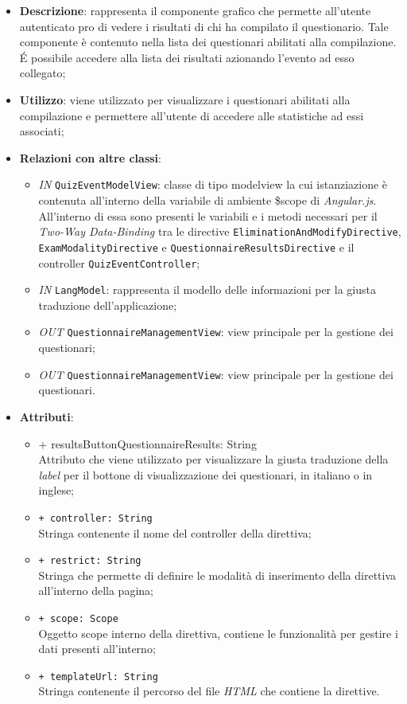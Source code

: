 \begin{itemize}
	\item \textbf{Descrizione}: rappresenta il componente grafico che permette all'utente autenticato pro di vedere i risultati di chi ha compilato il questionario. Tale componente è contenuto nella lista dei questionari abilitati alla compilazione. \'E possibile accedere alla lista dei risultati azionando l'evento ad esso collegato;
	\item \textbf{Utilizzo}: viene utilizzato per visualizzare i questionari abilitati alla compilazione e permettere all'utente di accedere alle statistiche ad essi associati;
	\item \textbf{Relazioni con altre classi}: 
	\begin{itemize} 
		\item \textit{IN} \texttt{QuizEventModelView}: classe di tipo modelview la cui istanziazione è contenuta all'interno della variabile di ambiente \$scope di \textit{Angular.js}. All'interno di essa sono presenti le variabili e i metodi necessari per il \textit{Two-Way Data-Binding} tra le directive \texttt{EliminationAndModifyDirective}, \texttt{ExamModalityDirective} e \texttt{QuestionnaireResultsDirective} e il controller \texttt{QuizEventController};
		\item \textit{IN} \texttt{LangModel}: rappresenta il modello delle informazioni per la giusta traduzione dell'applicazione;
		\item \textit{OUT} \texttt{QuestionnaireManagementView}: view principale per la gestione dei questionari;
		\item \textit{OUT} \texttt{QuestionnaireManagementView}: view principale per la gestione dei questionari.
	\end{itemize}
	\item \textbf{Attributi}: 
	\begin{itemize}
		\item {+ resultsButtonQuestionnaireResults: String} \\ Attributo che viene utilizzato per visualizzare la giusta traduzione della \textit{label} per il bottone di visualizzazione dei questionari, in italiano o in inglese;
		\item \texttt{+ controller: String} \\ Stringa contenente il nome del controller della direttiva;
		\item \texttt{+ restrict: String} \\ Stringa che permette di definire le modalità di inserimento della direttiva all'interno della pagina;
		\item \texttt{+ scope: Scope} \\ Oggetto scope interno della direttiva, contiene le funzionalità per gestire i dati presenti all'interno;
		\item \texttt{+ templateUrl: String} \\ Stringa contenente il percorso del file \textit{HTML} che contiene la direttive.
	\end{itemize} 
\end{itemize}
